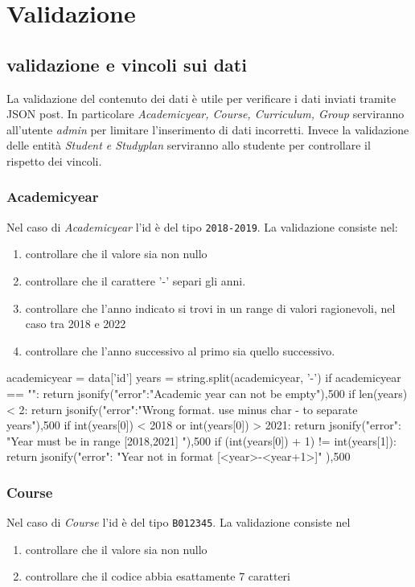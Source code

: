 \documentclass{article}
\begin{document}
\section{Validazione}



\subsection{validazione e vincoli sui dati}
La validazione del contenuto dei dati è utile per verificare i dati inviati tramite JSON post. In particolare \emph{ Academicyear, Course, Curriculum, Group} serviranno all'utente \textit{admin} per limitare l'inserimento di dati incorretti. Invece la validazione delle entità \emph{Student e  Studyplan} serviranno allo studente per controllare il rispetto dei vincoli.
\subsubsection{Academicyear}
Nel caso di \emph{ Academicyear} l'id è del tipo \texttt{2018-2019}.  La validazione consiste nel:
\begin{enumerate}
\item controllare che il valore sia non nullo
\item controllare che  il carattere '-' separi gli anni.
\item controllare che l'anno indicato si trovi in un range di valori ragionevoli, nel caso tra  2018 e 2022
\item controllare che l'anno successivo al primo sia quello successivo.
\end{enumerate}

\begin{python}
academicyear = data['id']
years = string.split(academicyear, '-')
if academicyear == "":
	return jsonify({"error":"Academic year can not be empty"}),500
if len(years) < 2:
	return jsonify({"error":"Wrong format. use minus char - to separate years"}),500
if int(years[0]) < 2018 or int(years[0]) > 2021:
	return jsonify({"error": "Year must be in range [2018,2021] "}),500
if (int(years[0]) + 1) != int(years[1]):
	return jsonify({"error": "Year not in format [<year>-<year+1>]" }),500
\end{python}

\subsubsection{Course}
Nel caso di \emph{Course} l'id è del tipo \texttt{B012345}. La validazione consiste nel
\begin{enumerate}
\item controllare che il valore sia non nullo
\item controllare che il codice abbia esattamente 7 caratteri
\end{enumerate}
\end{document}
